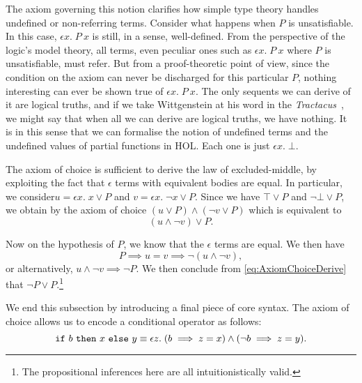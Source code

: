 The axiom governing this notion clarifies how simple type theory handles undefined or non-referring terms. Consider what happens when $P$ is unsatisfiable. In this case, $\epsilon x.\; P\ x$ is still, in a sense, well-defined. From the perspective of the logic's model theory, all terms, even peculiar ones such as $\epsilon x.\; P\ x$ where $P$ is unsatisfiable, must refer. But from a proof-theoretic point of view, since the condition on the axiom can never be discharged for this particular $P$, nothing interesting can ever be shown true of $\epsilon x.\; P\ x$. The only sequents we can derive of it are logical truths, and if we take Wittgenstein at his word in the \emph{Tractacus}~\cite{ToWitNothing}, we might say that when all we can derive are logical truths, we have nothing. It is in this sense that we can formalise the notion of undefined terms and the undefined values of partial functions in HOL. Each one is just $\epsilon x.\; \bot$.

The axiom of choice is sufficient to derive the law of excluded-middle, by exploiting the fact that $\epsilon$ terms with equivalent bodies are equal. In particular, we consider\linebreak $u = \epsilon x.\; x \vee P$ and $v = \epsilon x.\; \neg x \vee P$. Since we have $\top \vee P$ and $\neg \bot \vee P$, we obtain by the axiom of choice $(u \vee P) \wedge (\neg v \vee P)$ which is equivalent to
\begin{equation}
 (u \wedge \neg v) \vee P.\label{eq:AxiomChoiceDerive}
\end{equation}

Now on the hypothesis of $P$, we know that the $\epsilon$ terms are equal. We then have
\begin{displaymath}
P \implies u = v \implies \neg (u \wedge \neg v),
\end{displaymath}
or alternatively, $u \wedge \neg v \implies \neg P$. We then conclude from \eqref{eq:AxiomChoiceDerive} that $\neg P \vee P$.\footnote{The propositional inferences here are all intuitionistically valid.}

We end this subsection by introducing a final piece of core syntax. The axiom of choice allows us to encode a conditional operator as follows:
\begin{equation}
\code{if}\ b\ \code{then}\ x\ \code{else}\ y \equiv \epsilon z.\; (b \implies z = x) \wedge (\neg b \implies z = y) .
\end{equation}

